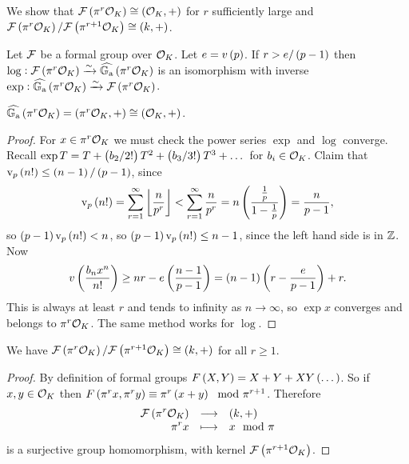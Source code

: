 \pagebreak

We show that $ \FFF\br{\pi^r\OOO_K} \cong \br{\OOO_K, +} $ for $ r $ sufficiently large and $ \FFF\br{\pi^r\OOO_K} / \FFF\br{\pi^{r + 1}\OOO_K} \cong \br{k, +} $.


\begin{theorem}
\label{thm:9.2}
Let $ \mathcal{F} $ be a formal group over $ \mathcal{O}_K $. Let $ e = v\br{p} $. If $ r > e / \br{p - 1} $ then $ \log : \FFF\br{\pi^r\OOO_K} \xrightarrow{\sim} \widehat{\GG_\a}\br{\pi^r\OOO_K} $ is an isomorphism with inverse $ \exp : \widehat{\GG_\a}\br{\pi^r\OOO_K} \xrightarrow{\sim} \FFF\br{\pi^r\OOO_K} $.
\end{theorem}

\begin{remark*}
$ \widehat{\GG_\a}\br{\pi^r\OOO_K} = \br{\pi^r\OOO_K, +} \cong \br{\OOO_K, +} $.
\end{remark*}

\begin{proof}
For $ x \in \pi^r\mathcal{O}_K $ we must check the power series $ \exp $ and $ \log $ converge. Recall $ \exp T = T + \br{b_2 / 2!}T^2 + \br{b_3 / 3!}T^3 + \dots $ for $ b_i \in \mathcal{O}_K $. Claim that $ \v_p\br{n!} \le \br{n - 1} / \br{p - 1} $, since
$$ \v_p\br{n!} = \sum_{r = 1}^\infty \fbr{\dfrac{n}{p^r}} < \sum_{r = 1}^\infty \dfrac{n}{p^r} = n\br{\dfrac{\tfrac{1}{p}}{1 - \tfrac{1}{p}}} = \dfrac{n}{p - 1}, $$
so $ \br{p - 1}\v_p\br{n!} < n $, so $ \br{p - 1}\v_p\br{n!} \le n - 1 $, since the left hand side is in $ \mathbb{Z} $. Now
$$ v\br{\dfrac{b_nx^n}{n!}} \ge nr - e\br{\dfrac{n - 1}{p - 1}} = \br{n - 1}\br{r - \dfrac{e}{p - 1}} + r. $$
This is always at least $ r $ and tends to infinity as $ n \to \infty $, so $ \exp x $ converges and belongs to $ \pi^r\mathcal{O}_K $. The same method works for $ \log $.
\end{proof}

\begin{lemma}
We have $ \FFF\br{\pi^r\OOO_K} / \FFF\br{\pi^{r + 1}\OOO_K} \cong \br{k, +} $ for all $ r \ge 1 $.
\end{lemma}

\begin{proof}
By definition of formal groups $ F\br{X, Y} = X + Y + XY\br{\dots} $. So if $ x, y \in \mathcal{O}_K $ then $ F\br{\pi^rx, \pi^ry} \equiv \pi^r\br{x + y} \mod \pi^{r + 1} $. Therefore
$$ \function{\FFF\br{\pi^r\OOO_K}}{\br{k, +}}{\pi^rx}{x \mod \pi} $$
is a surjective group homomorphism, with kernel $ \FFF\br{\pi^{r + 1}\OOO_K} $.
\end{proof}


